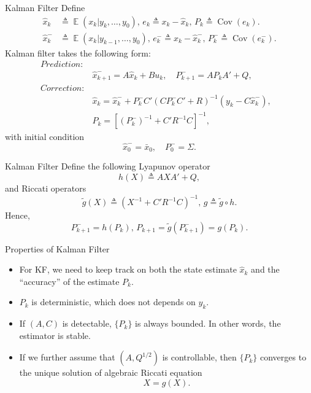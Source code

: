 \documentclass[10pt]{beamer}
\DeclareMathOperator{\1}{\textbf{1}}
\DeclareMathOperator{\Cov}{Cov}
\DeclareMathOperator{\E}{\mathbb E}
\begin{document}
  \begin{frame}{Kalman Filter}
    Define 
    \begin{displaymath}
      \begin{split}
	\hat x_k &\triangleq \E (x_k|y_k,\dots,y_0),\,e_k\triangleq  x_k -\hat x_k, \,P_k \triangleq \Cov(e_k).\\
	\hat x_k^- &\triangleq \E (x_k|y_{k-1},\dots,y_0),\,e_k^-\triangleq  x_k -\hat x_k^-, \,P_k^- \triangleq \Cov(e_k^-).
      \end{split}
    \end{displaymath}
    Kalman filter takes the following form:
    \begin{align*}
      Prediction:&&\\
      &\hat x _{k + 1}^-  = A \hat x_{k} + Bu_k  , \quad P_{k + 1}^-  = AP_{k} A'  + Q ,\\
      Correction:&&\\
      &\hat x_{k} = \hat x_{k}^-  + P_k^- C'(CP_k^- C'+R)^{-1} (y_k  - C \hat x _{k}^- ) , \\
      &P_{k} = \left[(P_{k}^-)^{-1} + C' R^{-1} C \right]^{-1},
    \end{align*}
    with initial condition
    \begin{displaymath}
      \hat x_{0}^-  = \bar x_0 ,\quad P_{0}^-  = \Sigma.
    \end{displaymath}
  \end{frame}

  \begin{frame}{Kalman Filter}
    Define the following Lyapunov operator
    \begin{displaymath}
      h(X) \triangleq AXA'  + Q, 
    \end{displaymath}
    and Riccati operators
    \begin{displaymath}
      \tilde g(X) \triangleq (X^{-1} + C'R^{-1}C)^{-1},\,g \triangleq \tilde g\circ h.
    \end{displaymath}
    Hence,
    \begin{displaymath}
      P_{k+1}^- = h(P_k),\,P_{k+1} =\tilde g(P_{k+1}^-) =  g(P_k). 
    \end{displaymath}
  \end{frame}

  \begin{frame}{Properties of Kalman Filter}
    \begin{itemize}
      \item For KF, we need to keep track on both the state estimate $\hat x_k$ and the ``accuracy'' of the estimate $P_k$.
      \item $P_k$ is deterministic, which does not depends on $y_k$.
      \item If $(A,C)$ is detectable, $\{P_k\}$ is always bounded. In other words, the estimator is stable.
      \item If we further assume that $(A,Q^{1/2})$ is controllable, then $\{P_k\}$ converges to the unique solution of algebraic Riccati equation 
	\begin{displaymath}
	  X = g(X). 
	\end{displaymath}
    \end{itemize}
  \end{frame}
\end{document}
